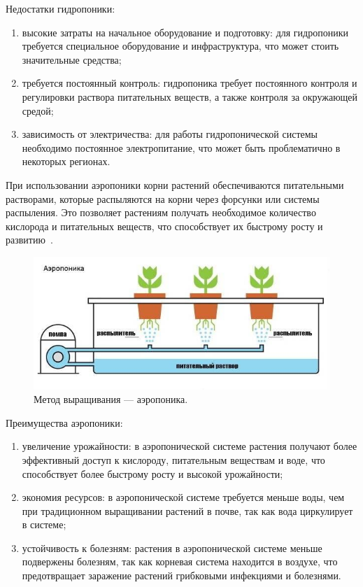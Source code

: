 Недостатки гидропоники:

\begin{enumerate}
    \item высокие затраты на начальное оборудование и подготовку: для гидропоники требуется специальное оборудование и инфраструктура, что может стоить значительные средства;
    \item требуется постоянный контроль: гидропоника требует постоянного контроля и регулировки раствора питательных веществ, а также контроля за окружающей средой;
    \item зависимость от электричества: для работы гидропонической системы необходимо постоянное электропитание, что может быть проблематично в некоторых регионах.
\end{enumerate}

При использовании аэропоники корни растений обеспечиваются питательными растворами, которые распыляются на корни через форсунки или системы распыления. Это позволяет растениям получать необходимое количество кислорода и питательных веществ, что способствует их быстрому росту и развитию~\cite{Aeroponica}.

\begin{figure}[H]
    \centering
    \includegraphics[scale=0.8]{images/aeroponica.jpg}
    \caption{Метод выращивания --- аэропоника.}
    \label{fig:aeroponica}
\end{figure}

Преимущества аэропоники:

\begin{enumerate}
    \item увеличение урожайности: в аэропонической системе растения получают более эффективный доступ к кислороду, питательным веществам и воде, что способствует более быстрому росту и высокой урожайности;
    \item экономия ресурсов: в аэропонической системе требуется меньше воды, чем при традиционном выращивании растений в почве, так как вода циркулирует в системе;
    \item устойчивость к болезням: растения в аэропонической системе меньше подвержены болезням, так как корневая система находится в воздухе, что предотвращает заражение растений грибковыми инфекциями и болезнями.
\end{enumerate}

